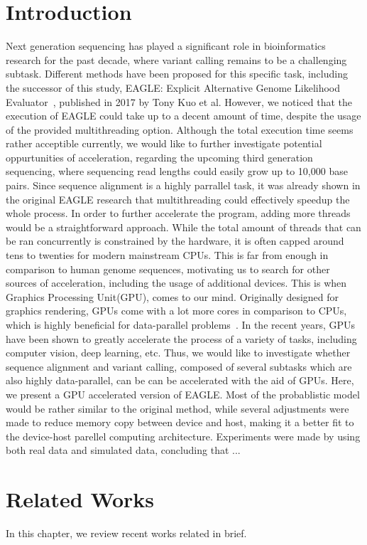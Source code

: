 \documentclass{PHlab-thesis}
\begin{document}
\chapter{Introduction}
Next generation sequencing has played a significant role in bioinformatics research for the past decade, where variant calling remains to be a challenging subtask. Different methods have been proposed for this specific task, including the successor of this study, EAGLE: Explicit Alternative Genome Likelihood Evaluator~\cite{kuo2018eagle}, published in 2017 by Tony Kuo et al. 
However, we noticed that the execution of EAGLE could take up to a decent amount of time, despite the usage of the provided multithreading option. Although the total execution time seems rather acceptible currently, we would like to further investigate potential oppurtunities of acceleration, regarding the upcoming third generation sequencing, where sequencing read lengths could easily grow up to 10,000 base pairs.
Since sequence alignment is a highly parrallel task, it was already shown in the original EAGLE research that multithreading could effectively speedup the whole process. In order to further accelerate the program, adding more threads would be a straightforward approach. While the total amount of threads that can be ran concurrently is constrained by the hardware, it is often capped around tens to twenties for modern mainstream CPUs. This is far from enough in comparison to human genome sequences, motivating us to search for other sources of acceleration, including the usage of additional devices. 
This is when Graphics Processing Unit(GPU), comes to our mind. Originally designed for graphics rendering, GPUs come with a lot more cores in comparison to CPUs, which is highly beneficial for data-parallel problems~\cite{navarro2014survey}. In the recent years, GPUs have been shown to greatly accelerate the process of a variety of tasks, including computer vision, deep learning, etc. Thus, we would like to investigate whether sequence alignment and variant calling, composed of several subtasks which are also highly data-parallel, can be can be accelerated with the aid of GPUs.
Here, we present a GPU accelerated version of EAGLE. Most of the probablistic model would be rather similar to the original method, while several adjustments were made to reduce memory copy between device and host, making it a better fit to the device-host parellel computing architecture. Experiments were made by using both real data and simulated data, concluding that ...

\chapter{Related Works}
In this chapter, we review recent works related in brief.
\end{document}
